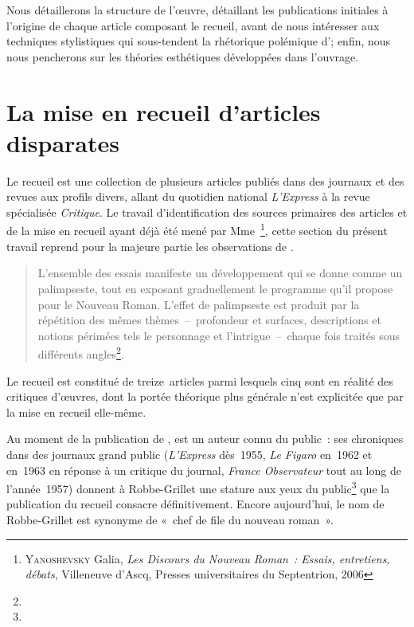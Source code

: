 \documentclass[12pt, a4paper]{article}
\begin{document}
Nous détaillerons la structure de l'œuvre, détaillant les publications initiales à l'origine de chaque article composant le recueil, avant de nous intéresser aux techniques stylistiques qui sous-tendent la rhétorique polémique d'\robbe ; enfin, nous nous pencherons sur les théories esthétiques développées dans l'ouvrage.

\newpage

\section{La mise en recueil d'articles disparates}



Le recueil \punr{} est une collection de plusieurs articles publiés dans des journaux et des revues aux profils divers, allant du quotidien national \textit{L'Express} à la revue spécialisée \textit{Critique}. Le travail d'identification des sources primaires des articles et de la mise en recueil ayant déjà été mené par Mme~\galia\footnote{\textsc{Yanoshevsky} Galia, \textit{Les Discours du Nouveau Roman~: Essais, entretiens, débats}, Villeneuve d'Ascq, Presses universitaires du Septentrion, 2006}, cette section du présent travail reprend pour la majeure partie les observations de \galia.
\begin{quote}
    L’ensemble des essais manifeste un développement qui se donne comme un palimpseste, tout en exposant graduellement le programme qu’il propose pour le Nouveau Roman. L’effet de palimpseste est produit par la répétition des mêmes thèmes~–~profondeur et surfaces, descriptions et notions périmées tels le personnage et l’intrigue~–~chaque fois traités sous différents angles\footnote{}.
\end{quote}
Le recueil est constitué de treize~articles parmi lesquels cinq sont en réalité des critiques d'œuvres, dont la portée théorique plus générale n'est explicitée que par la mise en recueil elle-même.

Au moment de la publication de \punr, \robbe{} est un auteur connu du public~: ses chroniques dans des journaux grand public (\textit{L'Express} dès~1955, \textit{Le Figaro} en~1962 et en~1963 en réponse à un critique du journal, \textit{France Observateur} tout au long de l'année~1957) donnent à Robbe-Grillet une stature aux yeux du public\footnote{} que la publication du recueil consacre définitivement. Encore aujourd'hui, le nom de Robbe-Grillet est synonyme de «~chef de file du nouveau roman~».
\end{document}
